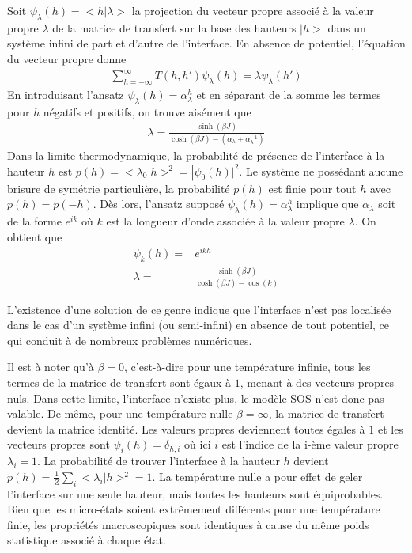 	Soit $\psi_\lambda(h)= <h|\lambda>$ la projection du vecteur propre associé à la valeur propre $\lambda$ de la matrice de transfert sur la base des hauteurs $|h>$ dans un système infini de part et d'autre de l'interface. En absence de potentiel\cite{guyer_sine-gordon_1979,chui_pinning_1981}, l'équation du vecteur propre donne
\begin{align}
	\sum_{h=-\infty}^\infty T(h,h') \psi_\lambda(h) = \lambda \psi_\lambda(h')
\end{align}
En introduisant l'ansatz $\psi_\lambda(h) = \alpha_{\lambda}^h$ et en séparant de la somme les termes pour $h$ négatifs et positifs, on trouve aisément que 
\begin{align}
	\lambda = \frac{\sinh(\beta J)}{\cosh(\beta J)-(\alpha_{\lambda}+\alpha_{\lambda}^{-1})} 
\end{align}
Dans la limite thermodynamique, la probabilité de présence de l'interface à la hauteur $h$ est $p(h) = <\lambda_0|h>^2 = |\psi_0(h)|^2$. Le système ne possédant aucune brisure de symétrie particulière, la probabilité $p(h)$ est finie pour tout $h$ avec $p(h)=p(-h)$. Dès lors, l'ansatz supposé $\psi_\lambda(h) = \alpha_{\lambda}^h$ implique que $\alpha_{\lambda}$ soit de la forme $e^{ik}$ où $k$ est la longueur d'onde associée à la valeur propre $\lambda$. On obtient que 
\begin{align}
	\psi_k(h) =& e^{ikh} \\
	\lambda =& \frac{\sinh(\beta J)}{\cosh(\beta J) - \cos(k)}
	\label{lambda-sos}
\end{align}



L'existence d'une solution de ce genre indique que l'interface n'est pas localisée dans le cas d'un système infini (ou semi-infini) en absence de tout potentiel, ce qui conduit à de nombreux problèmes numériques. 

Il est à noter qu'à $\beta=0$, c'est-à-dire pour une température infinie, tous les termes de la matrice de transfert sont égaux à $1$, menant à des vecteurs propres nuls. Dans cette limite, l'interface n'existe plus, le modèle SOS n'est donc pas valable. De même, pour une température nulle $\beta=\infty$, la matrice de transfert devient la matrice identité. Les valeurs propres deviennent toutes égales à $1$ et les vecteurs propres sont $\psi_i(h) = \delta_{h,i}$ où ici $i$ est l'indice de la i-ème valeur propre $\lambda_i = 1$. La probabilité de trouver l'interface à la hauteur $h$ devient $p(h) = \frac{1}{Z}\sum_{i} <\lambda_i | h >^2 = 1$. La température nulle a pour effet de geler l'interface sur une seule hauteur, mais toutes les hauteurs sont équiprobables. Bien que les micro-états soient extrêmement différents pour une température finie, les propriétés macroscopiques sont identiques à cause du même poids statistique associé à chaque état.


